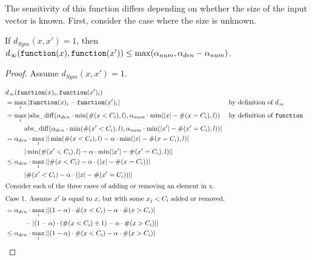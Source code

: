 \documentclass{article}
\begin{document}
The sensitivity of this function differs depending on whether the size of the input vector is known.
\label{unsized-stability}
First, consider the case where the size is unknown.

\begin{lemma}
    \label{single-change-stab-sym}
    If $d_{Sym}(x, x') = 1$, then $d_\infty(\texttt{function}(x), \texttt{function}(x')) \le \max(\alpha_{num}, \alpha_{den} - \alpha_{num})$.
\end{lemma}

\begin{proof}
    Assume $d_{Sym}(x, x') = 1$. 

    \begin{align*}
        &d_\infty(\function(x)_i, \function(x')_i) \\
        &= \max\limits_{i} |\function(x)_i - \function(x')_i| &&\text{by definition of } d_\infty \\
        &= \max\limits_{i} |\mathrm{abs\_diff}(\alpha_{den} \cdot \min(\#(x < C_i), l), \alpha_{num} \cdot \min(|x| - \#(x = C_i), l)) &&\text{by definition of } \function
            \\&\hspace{1cm}\mathrm{abs\_diff}(\alpha_{den} \cdot \min(\#(x' < C_i), l), \alpha_{num} \cdot \min(|x'| - \#(x' = C_i), l))| \\
        &= \alpha_{den} \cdot \max\limits_{i} ||\min(\#(x < C_i), l) - \alpha \cdot \min(|x| - \#(x = C_i), l)|
            \\&\hspace{1cm}|\min(\#(x' < C_i), l) - \alpha \cdot \min(|x'| - \#(x' = C_i), l)|| \\
        &\le \alpha_{den} \cdot \max\limits_{i} ||\#(x < C_i) - \alpha \cdot (|x| - \#(x = C_i))|
            \\&\hspace{1cm}|\#(x' < C_i) - \alpha \cdot (|x| - \#(x' = C_i))|| \\
    \intertext{Consider each of the three cases of adding or removing an element in x.}
    \intertext{Case 1. Assume $x'$ is equal to $x$, but with some $x_j < C_i$ added or removed.}
        &= \alpha_{den} \cdot \max\limits_{i} ||(1 - \alpha) \cdot \#(x < C_i) - \alpha \cdot \#(x > C_i)| 
            \\&\hspace{1cm} - |(1 - \alpha) \cdot (\#(x < C_i) \pm 1) - \alpha \cdot \#(x > C_i)|| \\
        &\leq \alpha_{den} \cdot  \max\limits_{i} ||(1 - \alpha) \cdot \#(x < C_i) - \alpha \cdot \#(x > C_i)|

\end{align*}
\end{proof}
\end{document}
